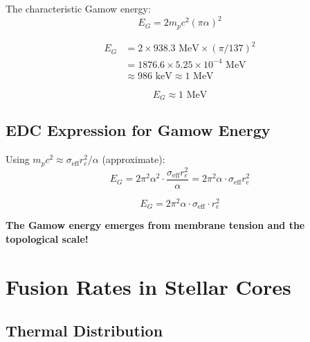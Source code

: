 \documentclass[12pt,a4paper]{article}
\begin{document}
The characteristic Gamow energy:
\begin{equation}
E_G = 2m_p c^2 (\pi\alpha)^2
\end{equation}

\begin{numerical}
\begin{align*}
E_G &= 2 \times 938.3 \text{ MeV} \times (\pi/137)^2 \\
&= 1876.6 \times 5.25 \times 10^{-4} \text{ MeV} \\
&\approx 986 \text{ keV} \approx 1 \text{ MeV}
\end{align*}
\end{numerical}

\begin{keyresult}
\begin{equation}
\boxed{E_G \approx 1 \text{ MeV}}
\end{equation}
\end{keyresult}

\subsection{EDC Expression for Gamow Energy}

Using $m_p c^2 \approx \sigma_{\text{eff}} r_e^2 / \alpha$ (approximate):
\begin{equation}
E_G = 2\pi^2\alpha^2 \cdot \frac{\sigma_{\text{eff}} r_e^2}{\alpha} = 2\pi^2\alpha \cdot \sigma_{\text{eff}} r_e^2
\end{equation}

\begin{keyresult}
\begin{equation}
\boxed{E_G = 2\pi^2\alpha \cdot \sigma_{\text{eff}} \cdot r_e^2}
\end{equation}

\textbf{The Gamow energy emerges from membrane tension and the topological scale!}
\end{keyresult}

\section{Fusion Rates in Stellar Cores}

\subsection{Thermal Distribution}
\end{document}
